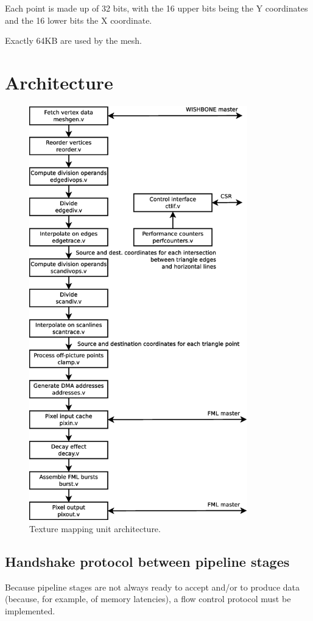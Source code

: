 \documentclass[a4paper,11pt]{article}
\begin{document}
Each point is made up of 32 bits, with the 16 upper bits being the Y coordinates and the 16 lower bits the X coordinate.

Exactly 64KB are used by the mesh.

\section{Architecture}

\begin{figure}[H]
\centering
\includegraphics[height=180mm]{architecture.eps}
\caption{Texture mapping unit architecture.}\label{fig:architecture}
\end{figure}

\subsection{Handshake protocol between pipeline stages}
Because pipeline stages are not always ready to accept and/or to produce data (because, for example, of memory latencies), a flow control protocol must be implemented.
\end{document}
